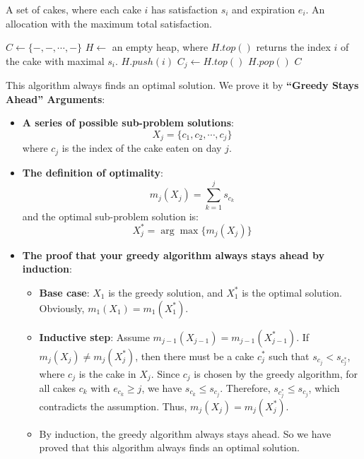 \begin{parts}
\begin{algorithm}[H]
\caption{Days descending, Cake maximal $s_i$}
\begin{algorithmic}[1]
\Require A set of cakes, where each cake $i$ has satisfaction $s_i$ and expiration $e_i$.
\Ensure An allocation with the maximum total satisfaction.

\State $C\gets \{-,-,\cdots,-\}$ 
\State $H\gets$ an empty heap, where $H.top()$ returns the index $i$ of the cake with maximal $s_i$.
 
        \State $H.push(i)$ 
    \EndFor
        \State $C_j\gets H.top()$ 
        \State $H.pop()$
    \EndIf
\EndFor
\State \Return $C$
\end{algorithmic}
\end{algorithm}

\begin{solution}
    This algorithm always finds an optimal solution. We prove it by \textbf{“Greedy Stays Ahead” Arguments}:
    \begin{itemize}
        \item \textbf{A series of possible sub-problem solutions}:
        \[X_j=\{c_1,c_2,\cdots,c_j\}\]
        where $c_j$ is the index of the cake eaten on day $j$.
        \item \textbf{The definition of optimality}:
        \[m_j(X_j)=\sum_{k=1}^j s_{c_k}\]
        and the optimal sub-problem solution is:
        \[X_j^*=\arg\max\{m_j(X_j)\}\]
        \item \textbf{The proof that your greedy algorithm always stays ahead by induction}:
        \begin{itemize}
            \item \textbf{Base case}: $X_1$ is the greedy solution, and $X_1^*$ is the optimal solution. Obviously, $m_1(X_1)=m_1(X_1^*)$.
            \item \textbf{Inductive step}: Assume $m_{j-1}(X_{j-1})=m_{j-1}(X_{j-1}^*)$. If $m_j(X_j)\ne m_j(X_j^*)$, then there must be a cake $c_j^*$ such that $s_{c_j} < s_{c_j^*}$, where $c_j$ is the cake in $X_j$. Since $c_j$ is chosen by the greedy algorithm, for all cakes $c_k$ with $e_{c_k} \geq j$, we have $s_{c_k} \leq s_{c_j}$. Therefore, $s_{c_j^*} \leq s_{c_j}$, which contradicts the assumption. Thus, $m_j(X_j)=m_j(X_j^*)$.
            \item By induction, the greedy algorithm always stays ahead. So we have proved that this algorithm always finds an optimal solution.
        \end{itemize}
    \end{itemize}
\end{solution}


\end{parts}